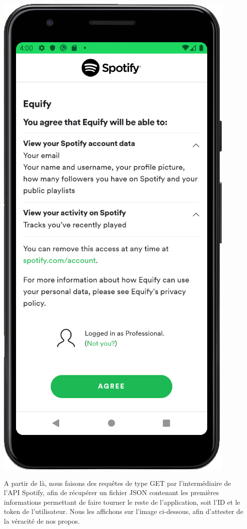 \documentclass[12pt, openany]{report}
\begin{document}
    \includegraphics[scale=0.5]{images/accord_spotify.png}
    
    \newpage
    
    A partir de là, nous faisons des requêtes de type GET par l'intermédiaire de l'API Spotify, afin de récupérer un fichier JSON contenant les premières informations permettant de faire tourner le reste de l'application, soit l'ID et le token de l'utilisateur. Nous les affichons sur l'image ci-dessous, afin d'attester de la véracité de nos propos.
    \\
    \\
    
\end{document}
